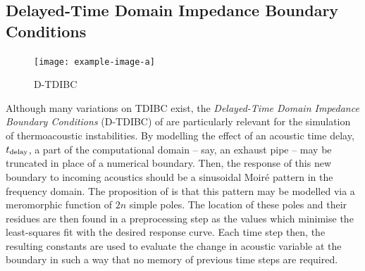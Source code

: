 








\subsection{Delayed-Time Domain Impedance Boundary Conditions}




\begin{figure}[t]
\centering
\texttt{[image: example-image-a]}
\caption{D-TDIBC}
\label{fig:D-TDIBC}
\end{figure}

Although many variations on TDIBC exist, the \emph{Delayed-Time Domain Impedance Boundary Conditions} (D-TDIBC) of \cite{douasbin2018DelayedtimeDomainImpedance} are particularly relevant for the simulation of thermoacoustic instabilities. By modelling the effect of an acoustic time delay, $t_{\rm{delay}}$, a part of the computational domain -- say, an exhaust pipe -- may be truncated in place of a numerical boundary. Then, the response of this new boundary to incoming acoustics should be a sinusoidal Moiré pattern in the frequency domain. The proposition of \cite{douasbin2018DelayedtimeDomainImpedance} is that this pattern may be modelled via a meromorphic function of $2n$ simple poles. The location of these poles and their residues are then found in a preprocessing step as the values which minimise the least-squares fit with the desired response curve. Each time step then, the resulting constants are used to evaluate the change in acoustic variable at the boundary in such a way that no memory of previous time steps are required. 

